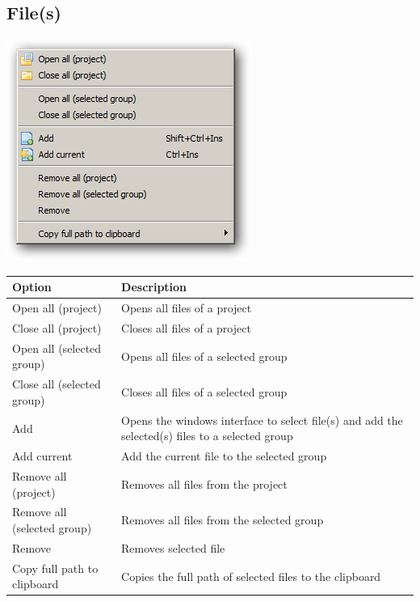 \hypertarget{menu_project_file}{}
\subsection{File(s)}

\includegraphics[scale=0.50]{./res/menu_project_file.png}\\

\begin{scriptsize}\begin{tabularx}{\textwidth}{>{\hsize=0.4\hsize}X>{\hsize=0.7\hsize}X}\\
    \hline
    \textbf{Option} & \textbf{Description} \\
    \hline
    Open all (project) & Opens all files of a project \\
    Close all (project) & Closes all files of a project \\
    Open all (selected group) & Opens all files of a selected group \\
    Close all (selected group) & Closes all files of a selected group \\
    Add & Opens the windows interface to select file(s) and add the selected(s) files to a selected group \\
    Add current & Add the current file to the selected group \\
    Remove all (project) & Removes all files from the project \\
    Remove all (selected group) & Removes all files from the selected group \\
    Remove & Removes selected file \\
    Copy full path to clipboard & Copies the full path of selected files to the clipboard \\
    \hline
  \end{tabularx}\end{scriptsize}
